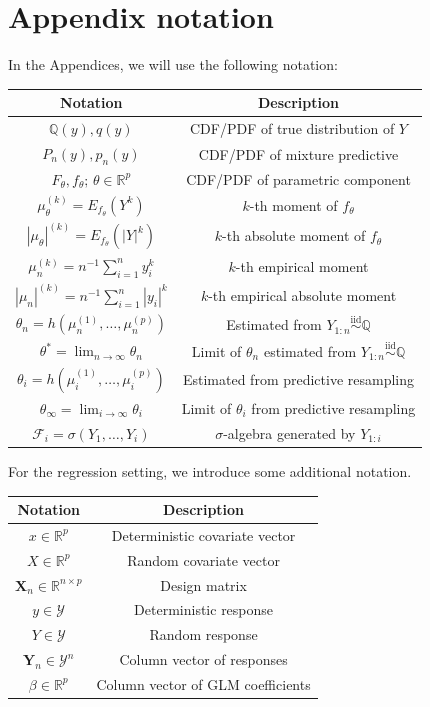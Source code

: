 \documentclass[11pt,a4paper]{article}
\newcommand{\iid}{\overset{\mathrm{iid}}{\sim}}
\theoremstyle{plain}
\theoremstyle{remark}
\theoremstyle{remark}
\begin{document}
\section*{Appendix notation}
 In the Appendices, we will use the following notation: 
\begin{center}
\begin{tabular}{ c|c } 
 Notation & Description \\ 
  \hline
 $\mathbb{Q}(y), q(y)$ & CDF/PDF of true distribution of $Y$  \\ 
 $P_n(y), p_n(y)$ & CDF/PDF of mixture predictive  \\ 
 $F_\theta, f_\theta; \, \theta \in \mathbb{R}^p$ & CDF/PDF of parametric component\\
  $\mu^{(k)}_\theta = E_{f_\theta}(Y^k)$ & $k$-th moment of $f_{\theta}$\\
  $|\mu_\theta|^{(k)} = E_{f_\theta}(|Y|^k)$ & $k$-th absolute moment of  $f_{\theta}$\\
  $\mu^{(k)}_n=n^{-1}\sum_{i=1}^n y_i^k$ & $k$-th empirical moment \\
  $|\mu_n|^{(k)}=n^{-1}\sum_{i=1}^n |y_i|^k$ & $k$-th empirical absolute moment\\
  $\theta_n = h(\mu_n^{(1)},\ldots, \mu_n^{(p)})$  &  Estimated from $Y_{1:n}\iid \mathbb{Q}$\\
    $\theta^* = \lim_{n \to \infty} \theta_n$ & Limit of $\theta_n$ estimated from $Y_{1:n} \iid \mathbb{Q}$ \\
    $\theta_i = h(\mu_i^{(1)},\ldots, \mu_i^{(p)})$ & Estimated from predictive resampling \\
  $\theta_\infty = \lim_{i \to \infty} \theta_i$ & Limit of $\theta_i$ from predictive resampling\\
       $\mathcal{F}_i=\sigma(Y_1,\ldots,Y_i)$ &  $\sigma$-algebra generated by $Y_{1:i}$ 
\end{tabular}
\end{center}\vspace{5mm}

For the regression setting, we introduce some additional notation.
\begin{center}
\begin{tabular}{ c|c } 
 Notation & Description \\ 
  \hline
       $x\in \mathbb{R}^p$ & Deterministic covariate vector\\
            $X\in \mathbb{R}^p$ & Random covariate vector\\
  $\mathbf{X}_n\in \mathbb{R}^{n\times p}$ & Design matrix \\
       $y \in \mathcal{Y}$& Deterministic response\\
       $Y \in \mathcal{Y}$ & Random response\\ 
     $\mathbf{Y}_n \in \mathcal{Y}^n$ & Column vector of responses\\
     $\beta \in \mathbb{R}^p$ & Column vector of GLM coefficients
\end{tabular}
\end{center}\vspace{5mm}
\end{document}
